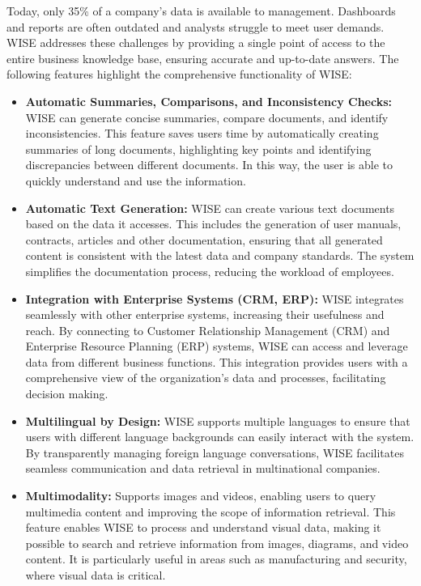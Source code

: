 Today, only 35\% of a company's data is available to management. Dashboards and reports are often outdated and analysts struggle to meet user demands. WISE addresses these challenges by providing a single point of access to the entire business knowledge base, ensuring accurate and up-to-date answers. The following features highlight the comprehensive functionality of WISE:

\begin{itemize}
    \item \textbf{Automatic Summaries, Comparisons, and Inconsistency Checks:} WISE can generate concise summaries, compare documents, and identify inconsistencies. This feature saves users time by automatically creating summaries of long documents, highlighting key points and identifying discrepancies between different documents. In this way, the user is able to quickly understand and use the information.
    
    \item \textbf{Automatic Text Generation:} WISE can create various text documents based on the data it accesses. This includes the generation of user manuals, contracts, articles and other documentation, ensuring that all generated content is consistent with the latest data and company standards. The system simplifies the documentation process, reducing the workload of employees.

    \item \textbf{Integration with Enterprise Systems (CRM, ERP):} WISE integrates seamlessly with other enterprise systems, increasing their usefulness and reach. By connecting to Customer Relationship Management (CRM) and Enterprise Resource Planning (ERP) systems, WISE can access and leverage data from different business functions. This integration provides users with a comprehensive view of the organization's data and processes, facilitating decision making.

    \item \textbf{Multilingual by Design:} WISE supports multiple languages to ensure that users with different language backgrounds can easily interact with the system. By transparently managing foreign language conversations, WISE facilitates seamless communication and data retrieval in multinational companies.

    \item \textbf{Multimodality:} Supports images and videos, enabling users to query multimedia content and improving the scope of information retrieval. This feature enables WISE to process and understand visual data, making it possible to search and retrieve information from images, diagrams, and video content. It is particularly useful in areas such as manufacturing and security, where visual data is critical.


\end{itemize}
